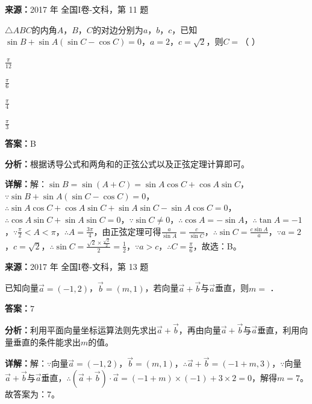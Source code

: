 \begin{question}[points=5]
\textbf{来源：}2017 年 全国I卷-文科，第 11 题\par
$\triangle ABC$的内角$A$，$B$，$C$的对边分别为$a$，$b$，$c$，已知$\sin B+\sin A(\sin C-\cos C)=0$，$a=2$，$c=\sqrt{2}$，则$C=$（    ）
\begin{choices}
  \item $\frac{\pi}{12}$
  \item $\frac{\pi}{6}$
  \item $\frac{\pi}{4}$
  \item $\frac{\pi}{3}$
\end{choices}
\begin{solution}
\textbf{答案：}B

\textbf{分析：}根据诱导公式和两角和的正弦公式以及正弦定理计算即可。

\textbf{详解：}解：$\sin B=\sin(A+C)=\sin A\cos C+\cos A\sin C$，$\because\sin B+\sin A(\sin C-\cos C)=0$，$\therefore\sin A\cos C+\cos A\sin C+\sin A\sin C-\sin A\cos C=0$，$\therefore\cos A\sin C+\sin A\sin C=0$，$\because\sin C\neq 0$，$\therefore\cos A=-\sin A$，$\therefore\tan A=-1$，$\because\frac{\pi}{2}<A<\pi$，$\therefore A=\frac{3\pi}{4}$，由正弦定理可得$\frac{a}{\sin A}=\frac{c}{\sin C}$，$\therefore\sin C=\frac{c\sin A}{a}$，$\because a=2$，$c=\sqrt{2}$，$\therefore\sin C=\frac{\sqrt{2}\times\frac{\sqrt{2}}{2}}{2}=\frac{1}{2}$，$\because a>c$，$\therefore C=\frac{\pi}{6}$，故选：B。
\end{solution}
\end{question}

\begin{question}[points=5]
\textbf{来源：}2017 年 全国I卷-文科，第 13 题\par
已知向量$\vec{a}=(-1,2)$，$\vec{b}=(m,1)$，若向量$\vec{a}+\vec{b}$与$\vec{a}$垂直，则$m=$ ．
\fillin[{$7$}]
\begin{solution}
\textbf{答案：}$7$

\textbf{分析：}利用平面向量坐标运算法则先求出$\vec{a}+\vec{b}$，再由向量$\vec{a}+\vec{b}$与$\vec{a}$垂直，利用向量垂直的条件能求出$m$的值。

\textbf{详解：}解：$\because$向量$\vec{a}=(-1,2)$，$\vec{b}=(m,1)$，$\therefore\vec{a}+\vec{b}=(-1+m,3)$，$\because$向量$\vec{a}+\vec{b}$与$\vec{a}$垂直，$\therefore(\vec{a}+\vec{b})\cdot\vec{a}=(-1+m)\times(-1)+3\times2=0$，解得$m=7$。故答案为：7。
\end{solution}
\end{question}

